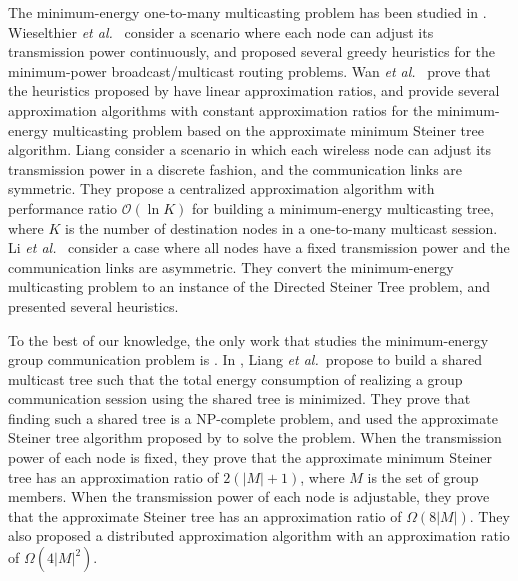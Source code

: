 \documentclass[10pt, conference, compsocconf]{IEEEtran}
\begin{document}
  The minimum-energy one-to-many multicasting problem has been studied in \cite{Wieselthier2000,Wan2004,Liang2006,Li2007}. Wieselthier \textit{et al.}\ \cite{Wieselthier2000} consider a scenario where each node can adjust its transmission power continuously, and proposed several greedy heuristics for the minimum-power broadcast/multicast routing problems. Wan \textit{et al.}\ \cite{Wan2004} prove that the heuristics proposed by \cite{Wieselthier2000} have linear approximation ratios, and provide several approximation algorithms with constant approximation ratios for the minimum-energy multicasting problem based on the approximate minimum Steiner tree algorithm. Liang \cite{Liang2006} consider a scenario in which each wireless node can adjust its transmission power in a discrete fashion, and the communication links are symmetric. They propose a centralized approximation algorithm with performance ratio $\mathcal{O}(\ln K)$ for building a minimum-energy multicasting tree, where $K$ is the number of destination nodes in a one-to-many multicast session. Li \textit{et al.}\ \cite{Li2007} consider a case where all nodes have a fixed transmission power and the communication links are asymmetric. They convert the minimum-energy multicasting problem to an instance of the Directed Steiner Tree problem, and presented several heuristics.

  To the best of our knowledge, the only work that studies the minimum-energy group communication problem is \cite{Liang2009}. In \cite{Liang2009}, Liang \textit{et al.}\ propose to build a shared multicast tree such that the total energy consumption of realizing a group communication session using the shared tree is minimized. They prove that finding such a shared tree is a NP-complete problem, and used the approximate Steiner tree algorithm proposed by \cite{Kou1981} to solve the problem. When the transmission power of each node is fixed, they prove that the approximate minimum Steiner tree has an approximation ratio of $2(|M|+1)$, where $M$ is the set of group members. When the transmission power of each node is adjustable, they prove that the approximate Steiner tree has an approximation ratio of $\Omega(8|M|)$. They also proposed a distributed approximation algorithm with an approximation ratio of $\Omega(4|M|^2)$.
\end{document}
